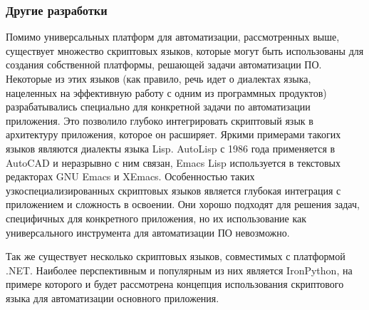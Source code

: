 \subsubsection{Другие разработки}

Помимо универсальных платформ для автоматизации, рассмотренных выше, существует множество скриптовых языков, которые могут быть использованы для создания собственной платформы, решающей задачи автоматизации ПО. Некоторые из этих языков (как правило, речь идет о диалектах языка, нацеленных на эффективную работу с одним из программных продуктов) разрабатывались специально для конкретной задачи по автоматизации приложения. Это позволило глубоко интегрировать скриптовый язык в архитектуру приложения, которое он расширяет. Яркими примерами такогих языков являются диалекты языка Lisp. AutoLisp с 1986 года применяется в AutoCAD и неразрывно с ним связан, Emacs Lisp используется в текстовых редакторах GNU Emacs и XEmacs. Особенностью таких узкоспециализированных скриптовых языков является глубокая интеграция с приложением и сложность в освоении. Они хорошо подходят для решения задач, специфичных для конкретного приложения, но их использование как универсального инструмента для автоматизации ПО невозможно.

Так же существует несколько скриптовых языков, совместимых с платформой .NET. Наиболее перспективным и популярным из них является IronPython, на примере которого и будет рассмотрена концепция использования скриптового языка для автоматизации основного приложения.


